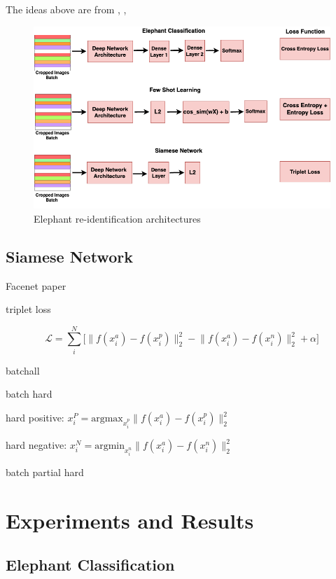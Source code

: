 \documentclass[10pt,twocolumn,letterpaper]{article}
\begin{document}
The ideas above are from \cite{fewshotlectures}, \cite{fewshotbaseline}, \cite{fewshotmetabaseline}


\begin{figure}[t]
  \centering
  \includegraphics[scale=0.275]{reidentification_network}
   \caption{Elephant re-identification architectures}
   \label{fig:reidentification_network}
\end{figure}

\subsection{Siamese Network}

Facenet paper

triplet loss

$$
\mathcal{L} = \sum_{i}^N \Big[ \lVert f(x_i^a) - f(x_i^p)\rVert_2^2 - \lVert f(x_i^a) - f(x_i^n)\rVert_2^2  + \alpha \Big]
$$

batchall

batch hard

hard positive: $x_i^P = \text{argmax}_{x_i^p}  \lVert f(x_i^a) - f(x_i^p)\rVert_2^2$

hard negative: $x_i^N = \text{argmin}_{x_i^n}  \lVert f(x_i^a) - f(x_i^n)\rVert_2^2$

batch partial hard




\section{Experiments and Results}
\label{sec:expresults} 

\subsection{Elephant Classification}
\end{document}
